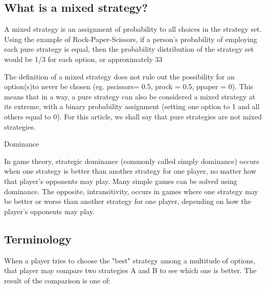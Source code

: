 \documentclass[]{report}
\begin{document}

\subsection{What is a mixed strategy?}

A mixed strategy is an assignment of probability to all choices in the strategy set. Using the example of Rock-Paper-Scissors, if a person’s probability of employing each pure strategy is equal, then the probability distribution of the strategy set would be 1/3 for each option, or approximately 33%

The definition of a mixed strategy does not rule out the possibility for an option(s)to never be chosen (eg. pscissors= 0.5, prock = 0.5, ppaper = 0). This means that in a way, a pure strategy can also be considered a mixed strategy at its extreme, with a binary probability assignment (setting one option to 1 and all others equal to 0). For this article, we shall say that pure strategies are not mixed strategies.



Dominance

In game theory, strategic dominance (commonly called simply dominance) occurs when one strategy is better than another strategy for one player, no matter how that player's opponents may play. Many simple games can be solved using dominance. The opposite, intransitivity, occurs in games where one strategy may be better or worse than another strategy for one player, depending on how the player's opponents may play.


\subsection{Terminology}
When a player tries to choose the "best" strategy among a multitude of options, that player may compare two strategies A and B to see which one is better. The result of the comparison is one of:
\end{document}
